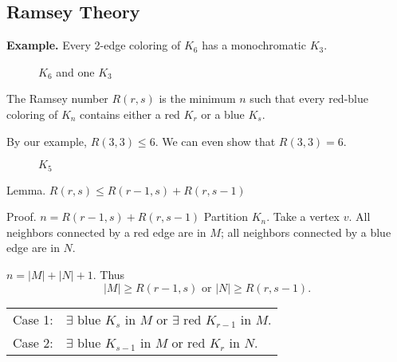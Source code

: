 \subsection{Ramsey Theory}

\textbf{Example.} Every 2-edge coloring of $K_6$ has a monochromatic $K_3$.

\begin{figure}[htb]
  \centering
  \caption{$K_6$ and one $K_3$}
\end{figure}
\FloatBarrier


\begin{definition}
The Ramsey number $R(r,s)$ is the minimum $n$ such that
every red-blue coloring of $K_n$ contains either a red $K_r$ or a blue $K_s$.
\end{definition}

By our example, $R(3,3) ≤ 6$. We can even show that $R(3,3) = 6$.

\begin{figure}[htb]
  \centering
  \caption{$K_5$}
\end{figure}

Lemma. $R(r,s) ≤ R(r-1, s) + R(r, s-1)$

Proof. $n = R(r-1, s) + R(r, s-1)$
Partition $K_n$. Take a vertex $v$. All neighbors connected by a red edge are in $M$; all neighbors connected by a blue edge are in $N$.

$n = |M|+|N|+1$. Thus
\[
  |M| ≥ R(r-1, s) \text{ or } |N| ≥ R(r, s-1).
\]

\begin{tabular}{ll}
  Case 1: & $\exists$ blue $K_s$ in $M$ or $\exists$ red $K_{r-1}$ in $M$. \\
  Case 2: & $\exists$ blue $K_{s-1}$ in $M$ or red $K_r$ in $N$.
\end{tabular}

